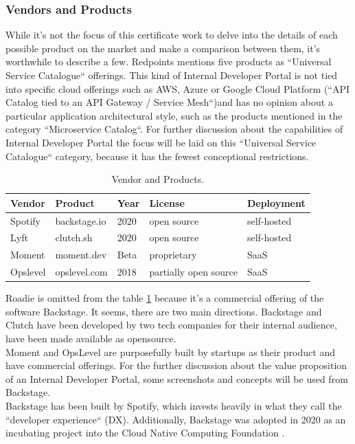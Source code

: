 \documentclass[a4paper,12pt]{article}
\begin{document}
    \subsubsection{Vendors and Products}
    \label{sssec:vendors}
    While it's not the focus of this certificate work to delve into the details of each possible product on the market
    and make a comparison between them, it's worthwhile to describe a few.
    Redpoints mentions five products as ``Universal Service Catalogue`` offerings\parencite{devportalsprimer}.
    This kind of Internal Developer Portal is not tied into specific cloud offerings such as AWS, Azure or Google
    Cloud Platform (``API Catalog tied to an API Gateway / Service Mesh``)and has no opinion about a particular application
    architectural style, such as the products mentioned in the category ``Microservice Catalog``.
    For further discussion about the capabilities of Internal Developer Portal the focus will be laid on this
    ``Universal Service Catalogue`` category, because it has the fewest conceptional restrictions.\\
    \begin{table}[!htbp]
        \begin{center}
            \begin{tabularx}{\textwidth}{lllll}
                \toprule
                Vendor   & Product      & Year & License               & Deployment  \\
                \midrule
                Spotify  & backstage.io & 2020 & open source           & self-hosted \\
                Lyft     & clutch.sh    & 2020 & open source           & self-hosted \\
                Moment   & moment.dev   & Beta & proprietary           & SaaS        \\
                Opslevel & opslevel.com & 2018 & partially open source & SaaS        \\
                \bottomrule
            \end{tabularx}
            \caption{\label{tab:vendors} Vendor and Products.}
        \end{center}
    \end{table}
    Roadie is omitted from the table \ref{tab:vendors} because it's a commercial offering of the software Backstage.
    It seems, there are two main directions.
    Backstage and Clutch have been developed by two tech companies for their internal audience, have been made
    available as opensource.\\
    Moment and OpsLevel are purposefully built by startups as their product and have commercial offerings.
    For the further discussion about the value proposition of an Internal Developer Portal, some screenshots and concepts will
    be used from Backstage.\\
    Backstage has been built by Spotify, which invests heavily in what they call the
    ``developer experience`` (DX)\parencite{spotifydx}.
    Additionally, Backstage was adopted in 2020 as an incubating project into the Cloud Native Computing Foundation\parencite{cncf} .
\end{document}
